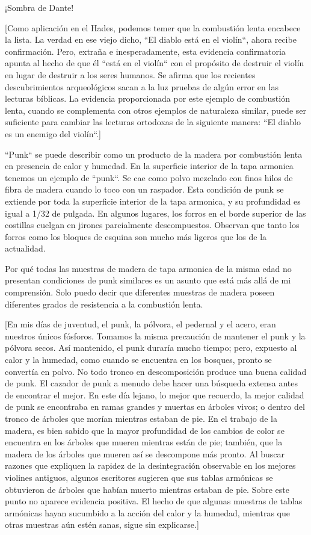 \documentclass[12pt]{book}
\begin{document}
¡Sombra de Dante!

[Como aplicación en el Hades, podemos temer que la combustión lenta encabece la lista. La verdad en ese viejo dicho, ``El diablo está en el violín``, ahora recibe confirmación. Pero, extraña e inesperadamente, esta evidencia confirmatoria apunta al hecho de que él ``está en el violín`` con el propósito de destruir el violín en lugar de destruir a los seres humanos. Se afirma que los recientes descubrimientos arqueológicos sacan a la luz pruebas de algún error en las lecturas bíblicas. La evidencia proporcionada por este ejemplo de combustión lenta, cuando se complementa con otros ejemplos de naturaleza similar, puede ser suficiente para cambiar las lecturas ortodoxas de la siguiente manera: ``El diablo es un enemigo del violín``.]

``Punk`` se puede describir como un producto de la madera por combustión lenta en presencia de calor y humedad. En la superficie interior de la tapa armonica tenemos un ejemplo de ``punk``. Se cae como polvo mezclado con finos hilos de fibra de madera cuando lo toco con un raspador. Esta condición de punk se extiende por toda la superficie interior de la tapa armonica, y su profundidad es igual a 1/32 de pulgada. En algunos lugares, los forros en el borde superior de las costillas cuelgan en jirones parcialmente descompuestos. Observan que tanto los forros como los bloques de esquina son mucho más ligeros que los de la actualidad.

Por qué todas las muestras de madera de tapa armonica de la misma edad no presentan condiciones de punk similares es un asunto que está más allá de mi comprensión. Solo puedo decir que diferentes muestras de madera poseen diferentes grados de resistencia a la combustión lenta.

[En mis días de juventud, el punk, la pólvora, el pedernal y el acero, eran nuestros únicos fósforos. Tomamos la misma precaución de mantener el punk y la pólvora secos. Así mantenido, el punk duraría mucho tiempo; pero, expuesto al calor y la humedad, como cuando se encuentra en los bosques, pronto se convertía en polvo. No todo tronco en descomposición produce una buena calidad de punk. El cazador de punk a menudo debe hacer una búsqueda extensa antes de encontrar el mejor. En este día lejano, lo mejor que recuerdo, la mejor calidad de punk se encontraba en ramas grandes y muertas en árboles vivos; o dentro del tronco de árboles que morían mientras estaban de pie. En el trabajo de la madera, es bien sabido que la mayor profundidad de los cambios de color se encuentra en los árboles que mueren mientras están de pie; también, que la madera de los árboles que mueren así se descompone más pronto. Al buscar razones que expliquen la rapidez de la desintegración observable en los mejores violines antiguos, algunos escritores sugieren que sus tablas armónicas se obtuvieron de árboles que habían muerto mientras estaban de pie. Sobre este punto no aparece evidencia positiva.
El hecho de que algunas muestras de tablas armónicas hayan sucumbido a la acción del calor y la humedad, mientras que otras muestras aún estén sanas, sigue sin explicarse.]
\end{document}
